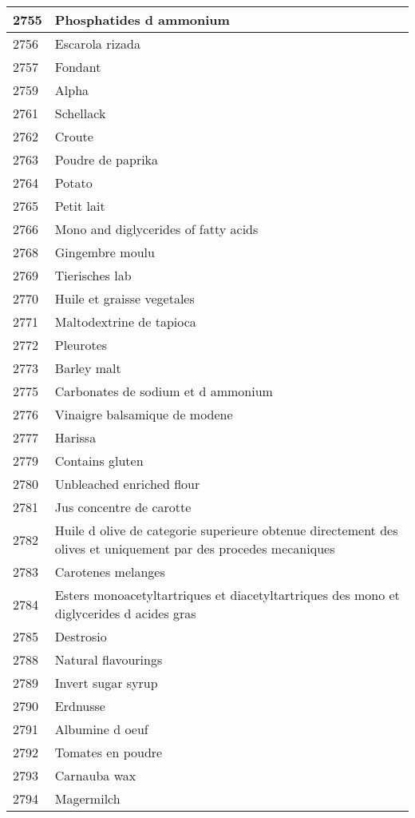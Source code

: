 \begin{longtable}{|l|l|}
2755 & Phosphatides d ammonium \\ \hline 
2756 & Escarola rizada \\ \hline 
2757 & Fondant \\ \hline 
2759 & Alpha \\ \hline 
2761 & Schellack \\ \hline 
2762 & Croute \\ \hline 
2763 & Poudre de paprika \\ \hline 
2764 & Potato \\ \hline 
2765 & Petit lait \\ \hline 
2766 & Mono and diglycerides of fatty acids \\ \hline 
2768 & Gingembre moulu \\ \hline 
2769 & Tierisches lab \\ \hline 
2770 & Huile et graisse vegetales \\ \hline 
2771 & Maltodextrine de tapioca \\ \hline 
2772 & Pleurotes \\ \hline 
2773 & Barley malt \\ \hline 
2775 & Carbonates de sodium et d ammonium \\ \hline 
2776 & Vinaigre balsamique de modene \\ \hline 
2777 & Harissa \\ \hline 
2779 & Contains gluten \\ \hline 
2780 & Unbleached enriched flour \\ \hline 
2781 & Jus concentre de carotte \\ \hline 
2782 & Huile d olive de categorie superieure obtenue directement des olives et uniquement par des procedes mecaniques \\ \hline 
2783 & Carotenes melanges \\ \hline 
2784 & Esters monoacetyltartriques et diacetyltartriques des mono et diglycerides d acides gras \\ \hline 
2785 & Destrosio \\ \hline 
2788 & Natural flavourings \\ \hline 
2789 & Invert sugar syrup \\ \hline 
2790 & Erdnusse \\ \hline 
2791 & Albumine d oeuf \\ \hline 
2792 & Tomates en poudre \\ \hline 
2793 & Carnauba wax \\ \hline 
2794 & Magermilch \\ \hline 

\end{longtable}
